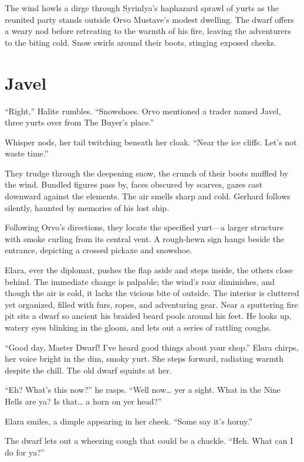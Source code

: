 \documentclass[
  letterpaper,12pt,twoside,twocolumn,openany,
  nodeprecatedcode,bg=full]{dndbook}
\begin{document}
The wind howls a dirge through Syrinlya's haphazard sprawl of yurts as
the reunited party stands outside Orvo Mustave's modest dwelling. The
dwarf offers a weary nod before retreating to the warmth of his fire,
leaving the adventurers to the biting cold. Snow swirls around their
boots, stinging exposed cheeks.

\section{Javel}\label{javel}

``Right,'' Halite rumbles. ``Snowshoes. Orvo mentioned a trader named
Javel, three yurts over from The Buyer's place.''

Whisper nods, her tail twitching beneath her cloak. ``Near the ice
cliffs. Let's not waste time.''

They trudge through the deepening snow, the crunch of their boots
muffled by the wind. Bundled figures pass by, faces obscured by scarves,
gazes cast downward against the elements. The air smells sharp and cold.
Gerhard follows silently, haunted by memories of his lost ship.

Following Orvo's directions, they locate the specified yurt---a larger
structure with smoke curling from its central vent. A rough-hewn sign
hangs beside the entrance, depicting a crossed pickaxe and snowshoe.

Elara, ever the diplomat, pushes the flap aside and steps inside, the
others close behind. The immediate change is palpable; the wind's roar
diminishes, and though the air is cold, it lacks the vicious bite of
outside. The interior is cluttered yet organized, filled with furs,
ropes, and adventuring gear. Near a sputtering fire pit sits a dwarf so
ancient his braided beard pools around his feet. He looks up, watery
eyes blinking in the gloom, and lets out a series of rattling coughs.

``Good day, Master Dwarf! I've heard good things about your shop.''
Elara chirps, her voice bright in the dim, smoky yurt. She steps
forward, radiating warmth despite the chill. The old dwarf squints at
her.

``Eh? What's this now?'' he rasps. ``Well now\ldots{} yer a sight. What
in the Nine Hells are ya? Is that\ldots{} a horn on yer head?''

Elara smiles, a dimple appearing in her cheek. ``Some say it's horny.''

The dwarf lets out a wheezing cough that could be a chuckle. ``Heh. What
can I do for ya?''
\end{document}
